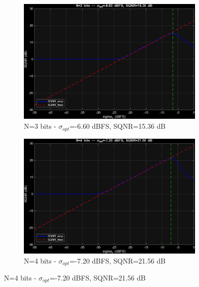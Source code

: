 \documentclass[11pt,a4paper]{article}
\begin{document}
\begin{figure}[H]
  \begin{subfigure}[t]{.4\textwidth}
    \centering
    \includegraphics[width=\linewidth]{img/task3_tri_n3.png}
    \caption{N=3 bits - $\sigma_{opt}$=-6.60 dBFS, SQNR=15.36 dB}
  \end{subfigure}
  \hfill
  \begin{subfigure}[t]{.4\textwidth}
    \centering
    \includegraphics[width=\linewidth]{img/task3_tri_n4.png}
    \caption{N=4 bits - $\sigma_{opt}$=-7.20 dBFS, SQNR=21.56 dB}
  \end{subfigure}

  \medskip


\end{figure}
\end{document}
